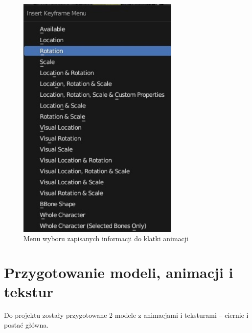 \documentclass[12pt,twoside]{article}
\begin{document}
\begin{figure}[ht!]
    \centering
    \includegraphics[width=8cm]{BlenderPict/Possible_Insert_KeyFrame.jpg}
    \caption{Menu wyboru zapisanych informacji do klatki animacji}
    \label{Blender:Insert_KeyFrame}
\end{figure}



\clearpage
\section{Przygotowanie modeli, animacji i tekstur}
Do projektu zostały przygotowane 2 modele z animacjami i teksturami –
ciernie i postać główna.
\end{document}
